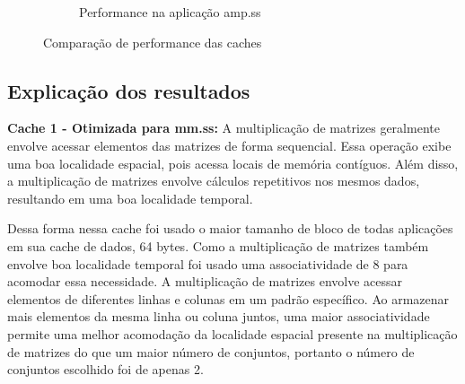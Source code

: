 \documentclass[12pt]{article}
\begin{document}
\begin{figure}[h]
  \begin{subfigure}[b]{\textwidth}
    \centering
    \caption{Performance na aplicação amp.ss}
  \end{subfigure}
  
  \caption{Comparação de performance das caches}
\end{figure}

\vspace{1cm}

\subsection{Explicação dos resultados}

\textbf{Cache 1 - Otimizada para mm.ss:} 
A multiplicação de matrizes geralmente envolve acessar elementos das matrizes de forma sequencial. Essa operação exibe uma boa localidade espacial, pois acessa locais de memória contíguos. Além disso, a multiplicação de matrizes envolve cálculos repetitivos nos mesmos dados, resultando em uma boa localidade temporal.

Dessa forma nessa cache foi usado o maior tamanho de bloco de todas aplicações em sua cache de dados, 64 bytes. Como a multiplicação de matrizes também envolve boa localidade temporal foi usado uma associatividade de 8 para acomodar essa necessidade. A multiplicação de matrizes envolve acessar elementos de diferentes linhas e colunas em um padrão específico. Ao armazenar mais elementos da mesma linha ou coluna juntos, uma maior associatividade permite uma melhor acomodação da localidade espacial presente na multiplicação de matrizes do que um maior número de conjuntos, portanto o número de conjuntos escolhido foi de apenas 2.
\end{document}
